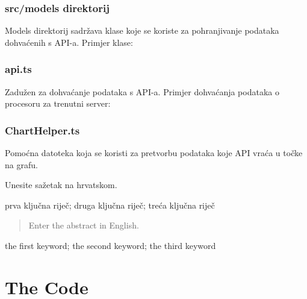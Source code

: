\documentclass[zavrsnirad]{fer}
\begin{document}
\subsection{src/models direktorij}
Models direktorij sadržava klase koje se koriste za pohranjivanje podataka dohvaćenih s API-a. Primjer klase:


\subsection{api.ts}
Zadužen za dohvaćanje podataka s API-a. Primjer dohvaćanja podataka o procesoru za trenutni server:


\subsection{ChartHelper.ts}
Pomoćna datoteka koja se koristi za pretvorbu podataka koje API vraća u točke na grafu.







\begin{sazetak}
  Unesite sažetak na hrvatskom.
\end{sazetak}

\begin{kljucnerijeci}
  prva ključna riječ; druga ključna riječ; treća ključna riječ
\end{kljucnerijeci}


\begin{abstract}
  Enter the abstract in English.
  
\end{abstract}

\begin{keywords}
  the first keyword; the second keyword; the third keyword
\end{keywords}



\backmatter

\chapter{The Code}
\end{document}
